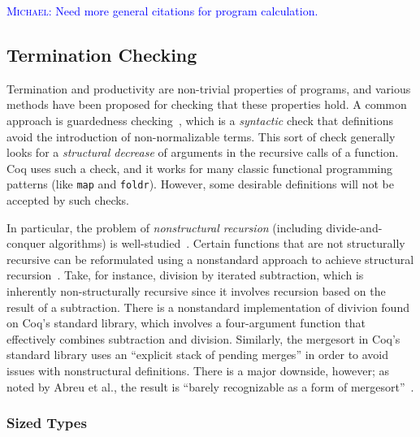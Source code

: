 \documentclass[a4paper, UKenglish, cleveref, autoref, thm-restate]{lipics-v2021}
\newcommand{\mvol}[1]{\textcolor{blue}{\textsc{Michael}: #1}}
\newcommand{\haskell}[1]{\texttt{#1}}
\begin{document}
\mvol{Need more general citations for program calculation.}

\subsection{Termination Checking}

Termination and productivity are non-trivial properties of programs, and various
methods have been proposed for checking that these properties hold. A common
approach is guardedness checking~\cite{10.5555/646535.695850}, which is a
\emph{syntactic} check that definitions avoid the introduction of
non-normalizable terms. This sort of check generally looks for a
\emph{structural decrease} of arguments in the recursive calls of a function.
Coq uses such a check, and it works for many classic functional programming
patterns (like \haskell{map} and \haskell{foldr}). However, some desirable
definitions will not be accepted by such checks.

In particular, the problem of \emph{nonstructural recursion} (including
divide-and-conquer algorithms) is well-studied~\cite{BOVE_KRAUSS_SOZEAU_2016}.
Certain functions that are not structurally recursive can be reformulated using
a nonstandard approach to achieve structural recursion~\cite{AbreuDHJMS23}.
Take, for instance, division by iterated subtraction, which is inherently
non-structurally recursive since it involves recursion based on the result of a
subtraction. There is a nonstandard implementation of divivion found on Coq's
standard library, which involves a four-argument function that effectively
combines subtraction and division. Similarly, the mergesort in Coq's standard
library uses an ``explicit stack of pending merges'' in order to avoid issues
with nonstructural definitions. There is a major downside, however; as noted by
Abreu et al., the result is ``barely recognizable as a form of
mergesort''~\cite{AbreuDHJMS23}.

\subsubsection{Sized Types}
\end{document}
